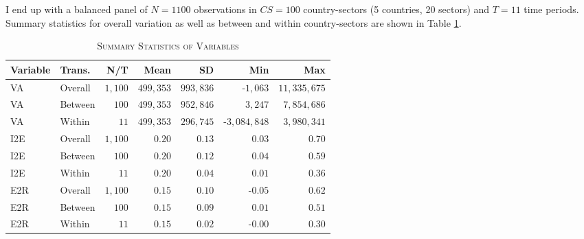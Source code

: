 \documentclass[a4paper]{article}
\begin{document}
I end up with a balanced panel of $N = 1100$ observations in $CS = 100$ country-sectors (5 countries, 20 sectors) and $T = 11$ time periods. Summary statistics for overall variation as well as between and within country-sectors are shown in Table \ref{tab:SUMM_GROWTH}. %

\begin{table}[h!] \centering 
  \caption{\label{tab:SUMM_GROWTH}\textsc{Summary Statistics of Variables}}
  \begin{center}
\begin{tabular}{ llrrrrr} \toprule
Variable & Trans. & N/T & Mean & SD & Min & Max \\ \midrule
VA & Overall & $1,100$ & $499,353$ & $993,836$ & -$1,063$ & $11,335,675$ \\ 
VA & Between & $100$ & $499,353$ & $952,846$ & $3,247$ & $7,854,686$ \\ 
VA & Within & $11$ & $499,353$ & $296,745$ & -$3,084,848$ & $3,980,341$ \\ 
I2E & Overall & $1,100$ & $0.20$ & $0.13$ & $0.03$ & $0.70$ \\ 
I2E & Between & $100$ & $0.20$ & $0.12$ & $0.04$ & $0.59$ \\ 
I2E & Within & $11$ & $0.20$ & $0.04$ & $0.01$ & $0.36$ \\ 
E2R & Overall & $1,100$ & $0.15$ & $0.10$ & -$0.05$ & $0.62$ \\ 
E2R & Between & $100$ & $0.15$ & $0.09$ & $0.01$ & $0.51$ \\ 
E2R & Within & $11$ & $0.15$ & $0.02$ & -$0.00$ & $0.30$ \\ \bottomrule
\end{tabular} 
 \end{center}
\end{table} 
\FloatBarrier 
\end{document}
